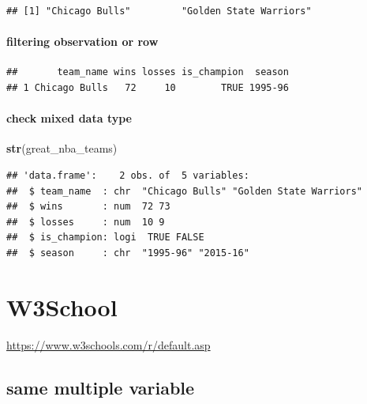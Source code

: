 \documentclass[
]{book}
\newenvironment{Shaded}{\begin{snugshade}}{\end{snugshade}}
\newcommand{\ConstantTok}[1]{\textcolor[rgb]{0.56,0.35,0.01}{#1}}
\newcommand{\FunctionTok}[1]{\textcolor[rgb]{0.13,0.29,0.53}{\textbf{#1}}}
\newcommand{\NormalTok}[1]{#1}
\newcommand{\OtherTok}[1]{\textcolor[rgb]{0.56,0.35,0.01}{#1}}
\newcommand{\SpecialCharTok}[1]{\textcolor[rgb]{0.81,0.36,0.00}{\textbf{#1}}}
\theoremstyle{definition}
\theoremstyle{definition}
\theoremstyle{definition}
\theoremstyle{definition}
\theoremstyle{remark}
\begin{document}
\begin{verbatim}
## [1] "Chicago Bulls"         "Golden State Warriors"
\end{verbatim}

\paragraph{filtering observation or row}\label{filtering-observation-or-row}

\begin{Shaded}
\end{Shaded}

\begin{verbatim}
##       team_name wins losses is_champion  season
## 1 Chicago Bulls   72     10        TRUE 1995-96
\end{verbatim}

\paragraph{check mixed data type}\label{check-mixed-data-type}

\begin{Shaded}
\begin{Highlighting}[]
\FunctionTok{str}\NormalTok{(great\_nba\_teams)}
\end{Highlighting}
\end{Shaded}

\begin{verbatim}
## 'data.frame':    2 obs. of  5 variables:
##  $ team_name  : chr  "Chicago Bulls" "Golden State Warriors"
##  $ wins       : num  72 73
##  $ losses     : num  10 9
##  $ is_champion: logi  TRUE FALSE
##  $ season     : chr  "1995-96" "2015-16"
\end{verbatim}

\section{W3School}\label{w3school}

\url{https://www.w3schools.com/r/default.asp}

\subsection{same multiple variable}\label{same-multiple-variable}
\end{document}
